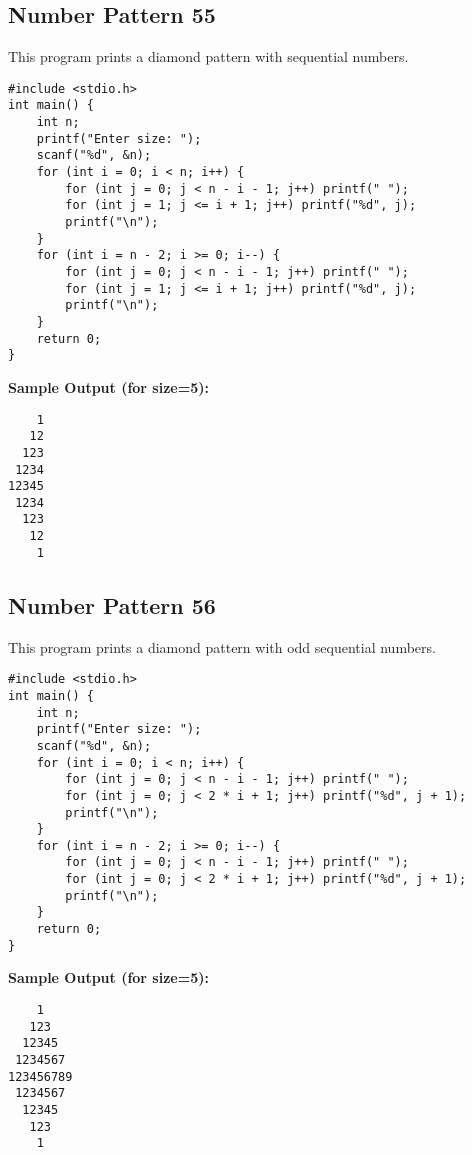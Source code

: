 \documentclass[a4paper,12pt]{article}
\begin{document}
\subsection{Number Pattern 55}
This program prints a diamond pattern with sequential numbers.
\begin{lstlisting}[caption={Number Pattern 55}]
#include <stdio.h>
int main() {
    int n;
    printf("Enter size: ");
    scanf("%d", &n);
    for (int i = 0; i < n; i++) {
        for (int j = 0; j < n - i - 1; j++) printf(" ");
        for (int j = 1; j <= i + 1; j++) printf("%d", j);
        printf("\n");
    }
    for (int i = n - 2; i >= 0; i--) {
        for (int j = 0; j < n - i - 1; j++) printf(" ");
        for (int j = 1; j <= i + 1; j++) printf("%d", j);
        printf("\n");
    }
    return 0;
}
\end{lstlisting}
\textbf{Sample Output (for size=5):}
\begin{verbatim}
    1
   12
  123
 1234
12345
 1234
  123
   12
    1
\end{verbatim}
\clearpage

\subsection{Number Pattern 56}
This program prints a diamond pattern with odd sequential numbers.
\begin{lstlisting}[caption={Number Pattern 56}]
#include <stdio.h>
int main() {
    int n;
    printf("Enter size: ");
    scanf("%d", &n);
    for (int i = 0; i < n; i++) {
        for (int j = 0; j < n - i - 1; j++) printf(" ");
        for (int j = 0; j < 2 * i + 1; j++) printf("%d", j + 1);
        printf("\n");
    }
    for (int i = n - 2; i >= 0; i--) {
        for (int j = 0; j < n - i - 1; j++) printf(" ");
        for (int j = 0; j < 2 * i + 1; j++) printf("%d", j + 1);
        printf("\n");
    }
    return 0;
}
\end{lstlisting}
\textbf{Sample Output (for size=5):}
\begin{verbatim}
    1
   123
  12345
 1234567
123456789
 1234567
  12345
   123
    1
\end{verbatim}
\clearpage
\end{document}
